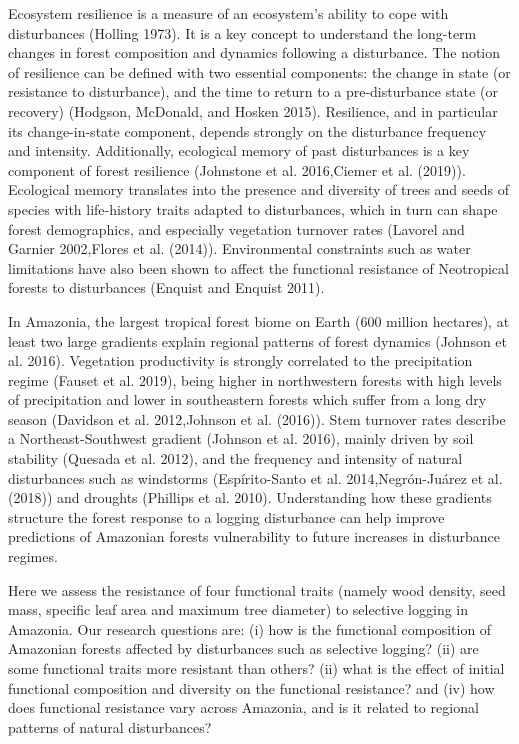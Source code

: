 \documentclass[]{elsarticle} %
\begin{document}
Ecosystem resilience is a measure of an ecosystem's ability to cope with
disturbances (Holling 1973). It is a key concept to understand the
long-term changes in forest composition and dynamics following a
disturbance. The notion of resilience can be defined with two essential
components: the change in state (or resistance to disturbance), and the
time to return to a pre-disturbance state (or recovery) (Hodgson,
McDonald, and Hosken 2015). Resilience, and in particular its
change-in-state component, depends strongly on the disturbance frequency
and intensity. Additionally, ecological memory of past disturbances is a
key component of forest resilience (Johnstone et al. 2016,Ciemer et al.
(2019)). Ecological memory translates into the presence and diversity of
trees and seeds of species with life-history traits adapted to
disturbances, which in turn can shape forest demographics, and
especially vegetation turnover rates (Lavorel and Garnier 2002,Flores et
al. (2014)). Environmental constraints such as water limitations have
also been shown to affect the functional resistance of Neotropical
forests to disturbances (Enquist and Enquist 2011).

In Amazonia, the largest tropical forest biome on Earth (600 million
hectares), at least two large gradients explain regional patterns of
forest dynamics (Johnson et al. 2016). Vegetation productivity is
strongly correlated to the precipitation regime (Fauset et al. 2019),
being higher in northwestern forests with high levels of precipitation
and lower in southeastern forests which suffer from a long dry season
(Davidson et al. 2012,Johnson et al. (2016)). Stem turnover rates
describe a Northeast-Southwest gradient (Johnson et al. 2016), mainly
driven by soil stability (Quesada et al. 2012), and the frequency and
intensity of natural disturbances such as windstorms (Espírito-Santo et
al. 2014,Negrón-Juárez et al. (2018)) and droughts (Phillips et al.
2010). Understanding how these gradients structure the forest response
to a logging disturbance can help improve predictions of Amazonian
forests vulnerability to future increases in disturbance regimes.

Here we assess the resistance of four functional traits (namely wood
density, seed mass, specific leaf area and maximum tree diameter) to
selective logging in Amazonia. Our research questions are: (i) how is
the functional composition of Amazonian forests affected by disturbances
such as selective logging? (ii) are some functional traits more
resistant than others? (ii) what is the effect of initial functional
composition and diversity on the functional resistance? and (iv) how
does functional resistance vary across Amazonia, and is it related to
regional patterns of natural disturbances?
\end{document}
